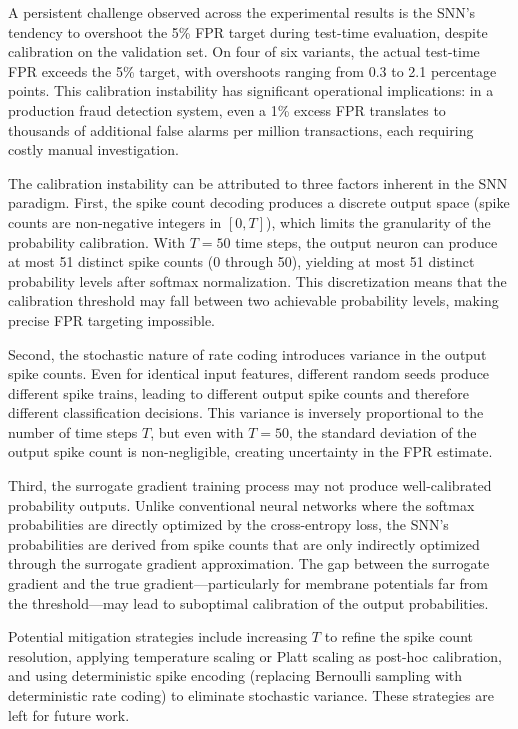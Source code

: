 A persistent challenge observed across the experimental results is the SNN's tendency to overshoot the 5\% FPR target during test-time evaluation, despite calibration on the validation set. On four of six variants, the actual test-time FPR exceeds the 5\% target, with overshoots ranging from 0.3 to 2.1 percentage points. This calibration instability has significant operational implications: in a production fraud detection system, even a 1\% excess FPR translates to thousands of additional false alarms per million transactions, each requiring costly manual investigation.

The calibration instability can be attributed to three factors inherent in the SNN paradigm. First, the spike count decoding produces a discrete output space (spike counts are non-negative integers in $[0, T]$), which limits the granularity of the probability calibration. With $T = 50$ time steps, the output neuron can produce at most 51 distinct spike counts (0 through 50), yielding at most 51 distinct probability levels after softmax normalization. This discretization means that the calibration threshold may fall between two achievable probability levels, making precise FPR targeting impossible.

Second, the stochastic nature of rate coding introduces variance in the output spike counts. Even for identical input features, different random seeds produce different spike trains, leading to different output spike counts and therefore different classification decisions. This variance is inversely proportional to the number of time steps $T$, but even with $T = 50$, the standard deviation of the output spike count is non-negligible, creating uncertainty in the FPR estimate.

Third, the surrogate gradient training process may not produce well-calibrated probability outputs. Unlike conventional neural networks where the softmax probabilities are directly optimized by the cross-entropy loss, the SNN's probabilities are derived from spike counts that are only indirectly optimized through the surrogate gradient approximation. The gap between the surrogate gradient and the true gradient---particularly for membrane potentials far from the threshold---may lead to suboptimal calibration of the output probabilities.

Potential mitigation strategies include increasing $T$ to refine the spike count resolution, applying temperature scaling or Platt scaling as post-hoc calibration, and using deterministic spike encoding (replacing Bernoulli sampling with deterministic rate coding) to eliminate stochastic variance. These strategies are left for future work.

